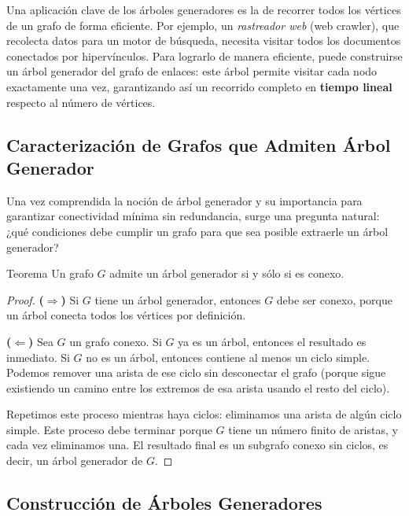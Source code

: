 Una aplicación clave de los árboles generadores es la de recorrer todos los vértices de un grafo de forma eficiente. Por ejemplo, un \textit{rastreador web} (web crawler), que recolecta datos para un motor de búsqueda, necesita visitar todos los documentos conectados por hipervínculos. Para lograrlo de manera eficiente, puede construirse un árbol generador del grafo de enlaces: este árbol permite visitar cada nodo exactamente una vez, garantizando así un recorrido completo en \textbf{tiempo lineal} respecto al número de vértices.



\subsection{Caracterización de Grafos que Admiten Árbol Generador}

Una vez comprendida la noción de árbol generador y su importancia para garantizar conectividad mínima sin redundancia, surge una pregunta natural: ¿qué condiciones debe cumplir un grafo para que sea posible extraerle un árbol generador? 


\begin{thmblock}{Teorema}
Un grafo $G$ admite un árbol generador si y sólo si es conexo.
\end{thmblock}

\begin{proof}
\textbf{($\Rightarrow$)} Si $G$ tiene un árbol generador, entonces $G$ debe ser conexo, porque un árbol conecta todos los vértices por definición.

\medskip

\textbf{($\Leftarrow$)} Sea $G$ un grafo conexo. Si $G$ ya es un árbol, entonces el resultado es inmediato. Si $G$ no es un árbol, entonces contiene al menos un ciclo simple. Podemos remover una arista de ese ciclo sin desconectar el grafo (porque sigue existiendo un camino entre los extremos de esa arista usando el resto del ciclo).

\medskip

Repetimos este proceso mientras haya ciclos: eliminamos una arista de algún ciclo simple. Este proceso debe terminar porque $G$ tiene un número finito de aristas, y cada vez eliminamos una. El resultado final es un subgrafo conexo sin ciclos, es decir, un árbol generador de $G$.
\end{proof}



\subsection{Construcción de Árboles Generadores}

